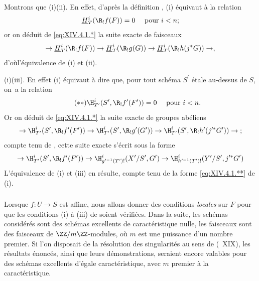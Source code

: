 Montrons que \textup{(i)}\SSI\textup{(ii)}. En effet, d'apr\`es la d\'efinition , \textup{(i)} \'equivaut \`a la relation
$$
\underline{H}_{T}^{i}(\R_{!}f(F))=0\quad\textrm{ pour }i<n\textrm{;}$$
or on d\'eduit de \eqref{eq:XIV.4.1.*} la suite exacte de faisceaux
$$
\to\underline{H}_{T}^{i}(\R_{!}f(F))\to\underline{H}_{T}^{i}(\R_{!}g(G))\to\underline{H}_{T}^{i}(\R_{!}h(j^{\ast}G))\to,
$$
d'o\`u\pageoriginale l'\'equivalence de \textup{(i)} et \textup{(ii)}.

\textup{(i)}\SSI\textup{(iii)}. En effet \textup{(i)} \'equivaut \`a dire que, pour tout sch\'ema $S^{\prime}$ \'etale au-dessus de $S$, on~a la relation
\begin{equation*} \label{eq:XIV.4.1.**} \tag{$**$} {\H_{T^{\prime}}^{i}(S^{\prime}, \R_{!}f^{\prime}(F^{\prime}))=0\quad\textrm{ pour }i<n.}
\end{equation*}
Or on d\'eduit de \eqref{eq:XIV.4.1.*} la suite exacte de groupes ab\'eliens
$$
\to\H_{T^{\prime}}^{i}(S^{\prime}, \R_{!}f^{\prime}(F^{\prime}))\to\H_{T^{\prime}}^{i}(S^{\prime}, \R_{!}g^{\prime}(G^{\prime}))\to \H_{T^{\prime}}^{i}(S^{\prime}, \R_{!}h^{\prime}(j^{\prime\ast}G^{\prime}))\to\;;$$
compte tenu de , cette suite exacte s'\'ecrit sous la forme
$$
\to\H_{T^{\prime}}^{i}(S^{\prime}, \R_{!}f^{\prime}(F^{\prime}))\to\H_{g^{\prime -1}(T^{\prime})!}^{i}(X^{\prime}/S^{\prime}, G^{\prime})\to\H_{h^{\prime -1}(T^{\prime})!}^{i}(Y^{\prime}/S^{\prime}, j^{\prime\ast}G^{\prime})$$
L'\'equivalence de \textup{(i)} et \textup{(iii)} en r\'esulte, compte tenu de la forme \eqref{eq:XIV.4.1.**} de \textup{(i)}.

\setcounter{subsubsection}{-1} \setcounter{subsection}{2}

\subsubsection{} \label{XIV.4.2.0}
Lorsque $f\colon U\to S$ est affine, nous allons donner des conditions \emph{locales} sur $F$ pour que les conditions \textup{(i)} \`a \textup{(iii)} de  soient v\'erifi\'ees. Dans la suite, les sch\'emas consid\'er\'es sont des sch\'emas excellents de caract\'eristique nulle, les faisceaux sont des faisceaux de $\ZZ/m\ZZ$-modules, o\`u $m$ est une puissance d'un nombre premier. Si l'on disposait de la r\'esolution des singularit\'es au sens de (~XIX), les r\'esultats \'enonc\'es, ainsi que leurs d\'emonstrations, seraient encore valables pour des sch\'emas excellents d'\'egale caract\'eristique, avec $m$ premier \`a la caract\'eristique.

